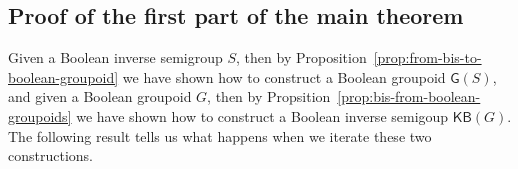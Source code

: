 \documentclass[a4paper]{amsart}
\begin{document}
\subsection{Proof of the first part of the main theorem}

Given a Boolean inverse semigroup $S$, then by Proposition~\ref{prop:from-bis-to-boolean-groupoid} we have shown how to construct a Boolean groupoid $\mathsf{G}(S)$,
and given a Boolean groupoid $G$, then by Propsition~\ref{prop:bis-from-boolean-groupoids} we have shown how to construct a Boolean inverse semigoup $\mathsf{KB}(G)$.
The following result tells us what happens when we iterate these two constructions.
\end{document}
